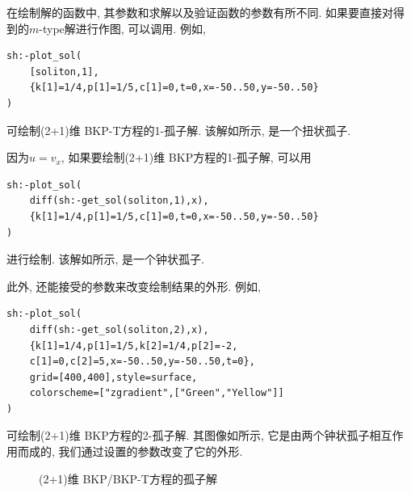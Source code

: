 在绘制解的函数中, 其参数和求解以及验证函数的参数有所不同. 如果要直接对得到的$m$-type解进行作图, 可以调用. 例如, 
\begin{verbatim}
sh:-plot_sol(
    [soliton,1],
    {k[1]=1/4,p[1]=1/5,c[1]=0,t=0,x=-50..50,y=-50..50}
)
\end{verbatim}
可绘制(2+1)维 BKP-T方程的1-孤子解. 该解如所示, 是一个扭状孤子.

因为$u=v_x$, 如果要绘制(2+1)维 BKP方程的1-孤子解, 可以用 
\begin{verbatim}
sh:-plot_sol(
    diff(sh:-get_sol(soliton,1),x),
    {k[1]=1/4,p[1]=1/5,c[1]=0,t=0,x=-50..50,y=-50..50}
)
\end{verbatim} 
进行绘制. 该解如所示, 是一个钟状孤子.

此外, 还能接受的参数来改变绘制结果的外形. 例如, 
\begin{verbatim}
sh:-plot_sol(
    diff(sh:-get_sol(soliton,2),x),
    {k[1]=1/4,p[1]=1/5,k[2]=1/4,p[2]=-2,
    c[1]=0,c[2]=5,x=-50..50,y=-50..50,t=0},
    grid=[400,400],style=surface,
    colorscheme=["zgradient",["Green","Yellow"]]
)
\end{verbatim} 
可绘制(2+1)维 BKP方程的2-孤子解. 其图像如所示, 它是由两个钟状孤子相互作用而成的, 我们通过设置的参数改变了它的外形.

\begin{figure}[H]
\centering
{}
\caption{(2+1)维 BKP/BKP-T方程的孤子解}\label{bkp}
\end{figure}

